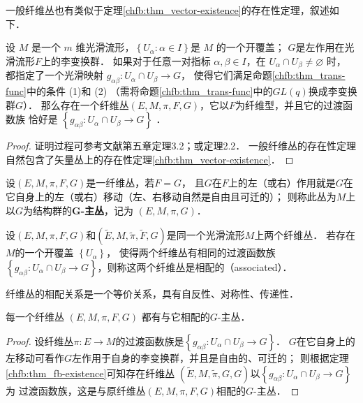 一般纤维丛也有类似于定理\ref{chfb:thm_vector-existence}的存在性定理，叙述如下．

\begin{theorem}\label{chfb:thm_fb-existence}
    设 $M$ 是一个 $m$ 维光滑流形，$\left\{U_\alpha: \alpha \in I\right\}$是 $M$ 的一个开覆盖；
    $G$是左作用在光滑流形$F$上的李变换群．
    如果对于任意一对指标 $\alpha, \beta \in I$，在 $U_\alpha \cap U_\beta \neq \varnothing$ 时，
    都指定了一个光滑映射 $g_{\alpha \beta}: U_\alpha \cap U_\beta \rightarrow G$，
    使得它们满足命题\ref{chfb:thm_trans-func}中的条件 (1)和 (2)
    （需将命题\ref{chfb:thm_trans-func}中的$GL(q)$换成李变换群$G$）．
    那么存在一个纤维丛$(E,M,\pi,F,G)$，它以$F$为纤维型，并且它的过渡函数族
    恰好是 $\left\{g_{\alpha \beta}: U_\alpha \cap U_\beta \rightarrow G\right\}$ ．
\end{theorem}

\begin{proof}
    证明过程可参考文献\parencite{Husemoller-1994}第五章定理3.2；或\parencite[\S 10.2]{chen-li-2004v2}定理2.2．
    一般纤维丛的存在性定理自然包含了矢量丛上的存在性定理\ref{chfb:thm_vector-existence}．
\end{proof}



\begin{definition}
    设$(E, M, \pi, F, G)$是一纤维丛，若$F=G$，
    且$G$在$F$上的左（或右）作用就是$G$在它自身上的左（或右）移动（左、右移动自然是自由且可迁的）；
    则称此丛为$M$上以$G$为结构群的{\heiti \bfseries G-主丛}，记为 $(E, M, \pi, G)$．
\end{definition} 

\begin{definition}\label{chfb:def_associated}
    设$(E, M, \pi, F, G)$和$(\widetilde{E}, M, \tilde{\pi}, \widetilde{F}, G)$是同一个光滑流形$M$上两个纤维丛．
    若存在$M$的一个开覆盖 $\left\{U_\alpha\right\}$，
    使得两个纤维丛有相同的过渡函数族$\left\{g_{\alpha \beta}:
    U_\alpha \cap U_\beta \rightarrow G\right\}$，则称这两个纤维丛是{\heiti 相配的}（associated）．
\end{definition} 

纤维丛的相配关系是一个等价关系，具有自反性、对称性、传递性．

\begin{proposition}
    每一个纤维丛 $(E, M, \pi, F, G)$ 都有与它相配的$G$-主丛．
\end{proposition} 
\begin{proof}
    设纤维丛$\pi: E \rightarrow M$的过渡函数族是$\left\{g_{\alpha \beta}: U_\alpha \cap U_\beta \rightarrow G\right\}$．
    $G$在它自身上的左移动可看作$G$左作用于自身的李变换群，并且是自由的、可迁的；
    则根据定理\ref{chfb:thm_fb-existence}可知存在纤维丛
    $(\widetilde{E}, M, \tilde{\pi},G, G)$以$\left\{g_{\alpha \beta}: U_\alpha \cap U_\beta \rightarrow G\right\}$为
    过渡函数族，这是与原纤维丛$(E, M, \pi, F, G)$相配的$G$-主丛．
\end{proof}

